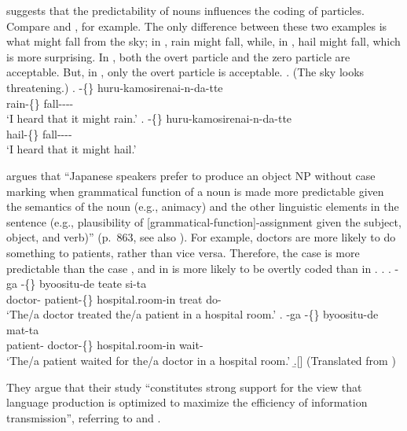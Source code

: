  suggests that
the predictability of nouns influences the coding of particles.
Compare \Next[a] and \Next[b], for example.
The only difference between these two examples is what
might fall from the sky;
in \Next[a], rain might fall,
while, in \Next[b], hail might fall,
which is more surprising.
In \Next[a], both the overt particle  and the zero particle
are acceptable.
But, in \Next[b], only the overt particle is acceptable.
%
\ex. (The sky looks threatening.)
 \ag. -\{\} huru-kamosirenai-n-da-tte \\
      rain-\{\} fall---- \\
      `I heard that it might rain.'
 \bg. -\{\} huru-kamosirenai-n-da-tte \\
      hail-\{\} fall---- \\
      `I heard that it might hail.'
      \hfill{\cite[290]{niwa06}}

 argues that
``Japanese speakers prefer to produce an object NP without case marking
when grammatical function of a noun is made more predictable
given the semantics of the noun (e.g., animacy) and
the other linguistic elements in the sentence
(e.g., plausibility of [grammatical-function]-assignment given the subject, object, and verb)'' (p.~863, see also ).
For example,
doctors are more likely to do something to patients,
rather than vice versa.
Therefore, the case \Next[a] is more predictable than the case \Next[b],
and  in \Next[b] is more likely to be overtly coded than
 in \Next[a].
%
\ex.
 \ag. -ga -\{\} byoositu-de teate si-ta \\
      doctor- patient-\{\} hospital.room-in treat do- \\
      `The/a doctor treated the/a patient in a hospital room.'
 \bg. -ga -\{\} byoositu-de mat-ta \\
      patient- doctor-\{\} hospital.room-in wait- \\
      `The/a patient waited for the/a doctor in a hospital room.'
  \b.[]    \hfill{(Translated from )}

They argue that their study
``constitutes strong support for the view that
language production is optimized to maximize the efficiency of information transmission'',
referring to  and .

